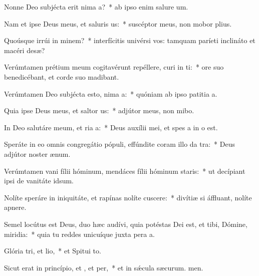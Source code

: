 \item Nonne Deo subjécta erit nima a?~* ab ipso enim salure um.
\item Nam et ipse Deus meus, et saluris us:~* suscéptor meus, non mobor plius.
\item Quoúsque irrúi in minem?~* interfícitis univérsi vos: tamquam paríeti inclináto et macéri desæ?
\item Verúmtamen prétium meum cogitavérunt repéllere, curi in ti:~* ore suo benedicébant, et corde suo madibant.
\item Verúmtamen Deo subjécta esto, nima a:~* quóniam ab ipso patitia a.
\item Quia ipse Deus meus, et saltor us:~* adjútor meus, non mibo.
\item In Deo salutáre meum, et ria a:~* Deus auxílii mei, et spes a in o est.
\item Speráte in eo omnis congregátio pópuli, effúndite coram illo da tra:~* Deus adjútor noster  ænum.
\item Verúmtamen vani fílii hóminum, mendáces fílii hóminum  staris:~* ut decípiant ipsi de vanitáte  idsum.
\item Nolíte speráre in iniquitáte, et rapínas nolíte cuscere:~* divítiæ si áffluant, nolíte  apnere.
\item Semel locútus est Deus, duo hæc audívi, quia potéstas Dei est, et tibi, Dómine, miridia:~* quia tu reddes unicuíque juxta pera a.
\item Glória tri, et lio,~* et Spitui to.
\item Sicut erat in princípio, et , et per,~* et in sǽcula sæcurum. men.
